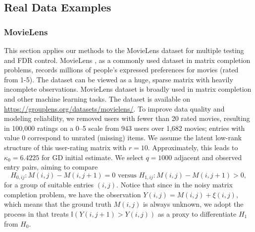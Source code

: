 \documentclass[12pt]{article}
\theoremstyle{plain}
\begin{document}
\begin{sloppypar}
\subsection{Real Data Examples}
\subsubsection{MovieLens}
This section applies our methods to the MovieLens dataset for multiple testing and FDR control. MovieLens \citep{harper2015movielens}, as a commonly used dataset in matrix completion problems, records millions of people’s expressed preferences for movies (rated from 1-5). The dataset can be viewed as a huge, sparse matrix with heavily incomplete observations. MovieLens dataset is broadly used in matrix completion \citep{hastie2015matrix,monti2017geometric,xia2021statistical} and other machine learning tasks. The dataset is available on \url{https://grouplens.org/datasets/movielens/}. To improve data quality and modeling reliability, we removed users with fewer than 20 rated movies, resulting in 100{,}000 ratings on a 0–5 scale from 943 users over 1{,}682 movies; entries with value 0 correspond to unrated (missing) items.
We assume the latent low-rank structure of this user-rating matrix with $r=10$. Approximately, this leads to $\kappa_0=6.4225$ for GD initial estimate. We select $q=1000$ 
adjacent and observed entry pairs, aiming to compare 
\begin{equation*}
    H_{0,ij}: M(i,j)-M(i,j+1)=0 \text{ versus } H_{1,ij}: M(i,j)-M(i,j+1)> 0,
\end{equation*}
for a group of suitable entries $(i,j)$.
 Notice that since in the noisy matrix completion problem, we have the observation $Y(i, j)=M(i, j)+\xi(i, j)$, which means that the ground truth $M(i, j)$ is always unknown, we adopt the process in \cite{xia2021statistical} that treats $\mathbb{I}\left(Y\left(i, j+1\right)>Y\left(i, j\right)\right)$ as a proxy to differentiate $H_1$ from $H_0$. %
 

\end{sloppypar}
\end{document}
